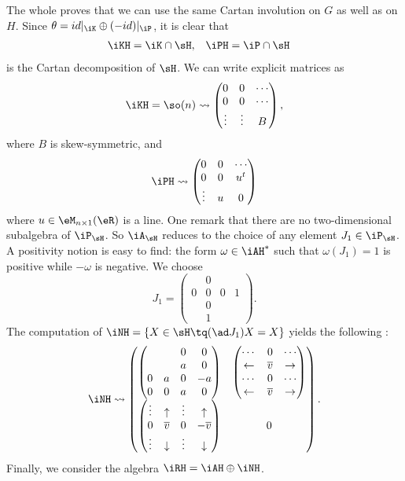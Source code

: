 The whole proves that we can use the same Cartan involution on $G$ as well as on $H$. Since $\theta=id|_{\iK}\oplus(-id)|_{\iP}$, it is clear that 
\begin{align}
   \iKH&=\iK\cap\sH,
   &\iPH&=\iP\cap\sH
\end{align}
is the Cartan decomposition of $\sH$. We can write explicit matrices as
\begin{equation}
\iKH=\so(n)\leadsto
\begin{pmatrix}
  0&0&\cdots  \\
  0&0&\cdots  \\
  \vdots&\vdots& B
\end{pmatrix},
\end{equation}
where $B$ is skew-symmetric, and
\begin{equation}
\iPH\leadsto
\begin{pmatrix}
  0&0&\cdots  \\
  0&0& u^t  \\
  \vdots&u& 0
\end{pmatrix}
\end{equation}
where $u\in\eM_{n\times 1}(\eR)$ is a line. One remark that there are no two-dimensional subalgebra of $\iP_{\sH}$. So $\iA_{\sH}$ reduces to the choice of any element $J_1\in\iP_{\sH}$.  A positivity notion is easy to find: the form $\omega\in\iAH^*$ such that $\omega(J_1)=1$ is positive while $-\omega$ is negative. We choose
\[
  J_1=\begin{pmatrix}&0\\0&0&0&1\\&0\\&1\end{pmatrix}.
\]
The computation of $\iNH=\{X\in\sH\tq (\ad J_1)X=X\}$ yields the following :
\begin{equation}\label{eq:re_N_H}
\iNH\leadsto
\begin{pmatrix}
     \begin{pmatrix} &&0&0\\&&a&0\\0&a&0&-a\\0&0&a&0\end{pmatrix}
     & \begin{pmatrix}\cdots&0&\cdots\\\leftarrow&\overline{v}&\rightarrow\\
        \cdots&0&\cdots\\\leftarrow&\overline{v}&\rightarrow\end{pmatrix}\\
     \begin{pmatrix}\vdots&\uparrow&\vdots&\uparrow\\
                    0& \overline{v}&0&-\overline{v}\\
		    \vdots&\downarrow& \vdots&\downarrow \end{pmatrix}
     &0		    
\end{pmatrix}.
\end{equation}
Finally, we consider the algebra $\iRH=\iAH\oplus\iNH$.

